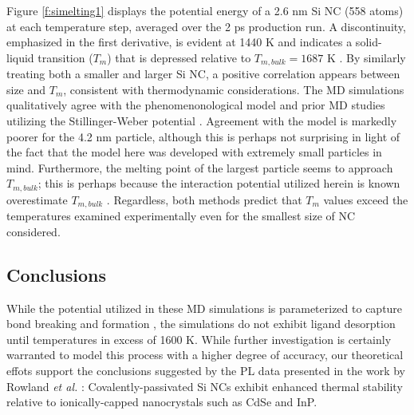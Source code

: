 Figure \ref{f:simelting1} displays the potential energy of a 2.6 nm Si NC (558 atoms) at each temperature step, averaged over the 2 ps production run. A discontinuity, emphasized in the first derivative, is evident at 1440 K and indicates a solid-liquid transition ($T_m$) that is depressed relative to $T_{m, bulk} = 1687$ K \cite{goldstein1992melting}. By similarly treating both a smaller and larger Si NC, a positive correlation appears between size and $T_m$, consistent with thermodynamic considerations. The MD simulations qualitatively agree with the phenomenonological model and prior MD studies utilizing the Stillinger-Weber potential \cite{fang2005investigation}. Agreement with the model is markedly poorer for the 4.2 nm particle, although this is perhaps not surprising in light of the fact that the model here was developed with extremely small particles in mind. Furthermore, the melting point of the largest particle seems to approach $T_{m, bulk}$; this is perhaps because the interaction potential utilized herein is known overestimate $T_{m, bulk}$ \cite{erhart2005analytical}. Regardless, both methods predict that $T_m$ values exceed the temperatures examined experimentally even for the smallest size of NC considered. \par
\subsection{Conclusions}
While the potential utilized in these MD simulations is parameterized to capture bond breaking and formation \cite{schall2008elastic}, the simulations do not exhibit ligand desorption until temperatures in excess of 1600 K. While further investigation is certainly warranted to model this process with a higher degree of accuracy, our theoretical effots support the conclusions suggested by the PL data presented in the work by Rowland \emph{et al.} \cite{rowland2014silicon}: Covalently-passivated Si NCs exhibit enhanced thermal stability relative to ionically-capped nanocrystals such as CdSe and InP.